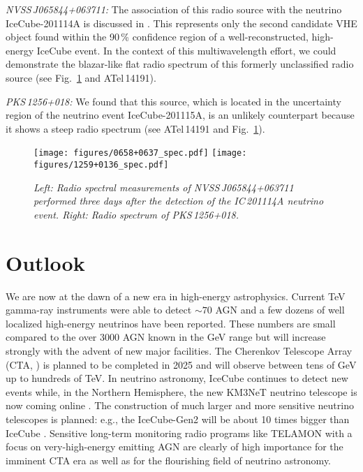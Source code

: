 \documentclass[a4paper,11pt]{article}
\begin{document}
\textsl{NVSS\,J065844+063711:} The association of this radio source with the neutrino IceCube-201114A is discussed in \cite[][these proceedings]{deMenezes2021}. This represents only the second candidate VHE object found within the 90\,\% confidence region of a well-reconstructed, high-energy IceCube event.
In the context of this multiwavelength effort, we could demonstrate the blazar-like flat radio spectrum of this formerly unclassified radio source (see Fig.~\ref{fig:0658_1259} and ATel\,14191).

\textsl{PKS\,1256+018:} We found that this source, which is located in the uncertainty region of the neutrino event IceCube-201115A, is an unlikely counterpart because it shows a steep radio spectrum (see ATel\,14191 and Fig.~\ref{fig:0658_1259}).

\begin{figure}
\centering
    \centering
    \texttt{[image: figures/0658+0637\_spec.pdf]}
    \texttt{[image: figures/1259+0136\_spec.pdf]}
    \caption{\small \sl Left: Radio spectral measurements of NVSS\,J065844+063711 performed three days after the detection of the IC\,201114A neutrino event.  Right: Radio spectrum of PKS\,1256+018.}
    \label{fig:0658_1259}
\end{figure}



\section{Outlook}
\noindent
We are now at the dawn of a new era in high-energy astrophysics.
Current TeV gamma-ray instruments were able to detect  $\sim70$ AGN
and a few dozens of well localized high-energy neutrinos have been reported.
These numbers are small compared to the over 3000 AGN known in the GeV range \cite{Ajello2020} but will increase strongly with the advent of new major facilities.
The
Cherenkov Telescope Array (CTA, \cite{Acharya2013}) is planned to be completed in 2025 and
will observe between tens of GeV up to hundreds of TeV.
 In neutrino astronomy, IceCube continues to detect new events while, in the Northern Hemisphere, the new KM3NeT neutrino telescope is now coming online \cite{AdrianMartinez2016}.  The construction of much larger and more sensitive neutrino telescopes is planned: e.g., the IceCube-Gen2 will be about 10 times bigger than IceCube \cite{aartsen2021}.
Sensitive long-term monitoring radio programs like TELAMON with a focus on very-high-energy emitting AGN are clearly of high importance for the imminent CTA era as well as for the flourishing field of neutrino astronomy. 
\end{document}
